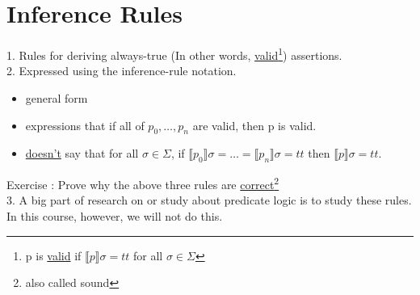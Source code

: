 \documentclass{article}[12pt]
\begin{document}
\section{Inference Rules}
1. Rules for deriving always-true (In other words, \underline{valid}\footnote{p is \underline{valid} if $\llbracket p \rrbracket \sigma = tt$ for all $\sigma \in \Sigma$}) assertions. \\
2. Expressed using the inference-rule notation. \\
\begin{itemize}
    \item general form
    \item expressions that if all of $p_0, \ldots, p_n$ are valid, then p is valid.
    \item \underline{doesn't} say that for all $\sigma \in \Sigma$, if $\llbracket p_0 \rrbracket \sigma = \ldots = \llbracket p_n \rrbracket \sigma = tt$ then $\llbracket p \rrbracket \sigma = tt$.
\end{itemize}
Exercise : Prove why the above three rules are \underline{correct}\footnote{also called sound} \\
3. A big part of research on or study about predicate logic is to study these rules. \\
In this course, however, we will not do this.
\end{document}

